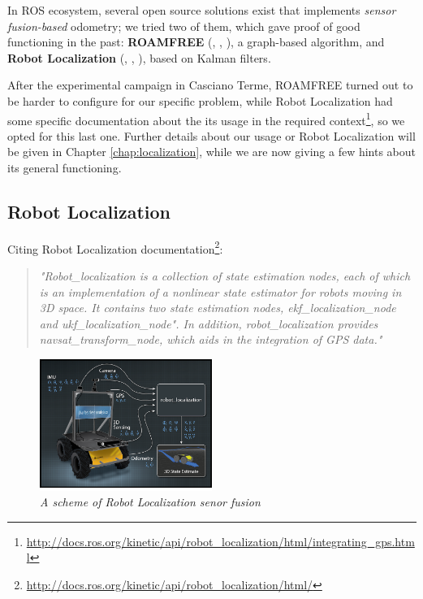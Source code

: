In \ac{ROS} ecosystem, several open source solutions exist that implements \textit{sensor fusion-based} odometry; we tried two of them, which gave proof of good functioning in the past: \textbf{ROAMFREE} (\cite{roamfreePaper}, \cite{roamfreeUtilizzo1}, \cite{roamfreeUtilizzo2}), a graph-based algorithm, and \textbf{Robot Localization} (\cite{robotLocalizationPaper}, \cite{robotLocalizationUtilizzo1}, \cite{robotLocalizationUtlizzo2}), based on Kalman filters.

After the experimental campaign in Casciano Terme, ROAMFREE turned out to be harder to configure for our specific problem, while Robot Localization had some specific documentation about the its usage in the required context\footnote{\url{http://docs.ros.org/kinetic/api/robot\_localization/html/integrating\_gps.html}},
so we opted for this last one. Further details about our usage or Robot Localization will be given in Chapter \ref{chap:localization}, while we are now giving a few hints about its general functioning.

\subsection{Robot Localization}\label{subsec:robotLocalization}

Citing Robot Localization documentation\footnote{\url{http://docs.ros.org/kinetic/api/robot\_localization/html/}}:
\blockquote{\textit{"Robot\_localization is a collection of state estimation nodes, each of which is an implementation of a nonlinear state estimator for robots moving in 3D space. It contains two state estimation nodes, ekf\_localization\_node and ukf\_localization\_node". In addition, robot\_localization provides navsat\_transform\_node, which aids in the integration of GPS data."}}

\begin{figure}
	\centering
	\includegraphics[width=0.5\textwidth]{Images/background_and_tools/robotLocalizationLogo.png}
	\caption{\textit{A scheme of Robot Localization senor fusion}}
	\label{fig:robotLocalizationDisegno}
\end{figure}

